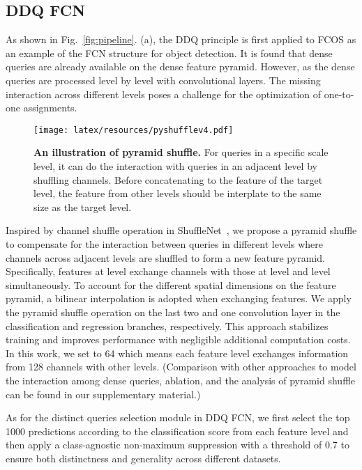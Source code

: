 \documentclass[10pt,twocolumn,letterpaper]{article}
\begin{document}
\subsection{DDQ FCN}   As shown in Fig.~\ref{fig:pipeline}. (a), the DDQ principle is first applied to FCOS as an example of the FCN structure for object detection. It is found that dense queries are already available on the dense feature pyramid. However, as the dense queries are processed level by level with convolutional layers. The missing interaction across different levels poses a challenge for the optimization of one-to-one assignments.

\begin{figure}[!h]
\centering
\texttt{[image: latex/resources/pyshufflev4.pdf]}
\vspace{-3mm}
\caption{\textbf{An illustration of pyramid shuffle.} For queries in a specific scale level,  it can do the interaction with queries in an adjacent level by shuffling  channels. Before concatenating to the feature of the target level, the feature from other levels should be interplate to the same size as the target level.}
\label{fig:shuffle}
\vspace{-3mm}
\end{figure}

Inspired by channel shuffle operation in ShuffleNet~\cite{zhang2018shufflenet}, we propose a pyramid shuffle to compensate for the interaction between queries in different levels where  channels across adjacent levels are shuffled to form a new feature pyramid. Specifically, features at level  exchange  channels with those at level  and level  simultaneously. To account for the different spatial dimensions on the feature pyramid, a bilinear interpolation is adopted when exchanging features. We apply the pyramid shuffle operation on the last two and one convolution layer in the classification and regression branches, respectively. This approach stabilizes training and improves performance with negligible additional computation costs. In this work, we set  to 64 which means each feature level exchanges information from 128 channels with other levels. (Comparison with other approaches to model the interaction among dense queries, ablation, and the analysis of pyramid shuffle can be found in our supplementary material.) 

As for the distinct queries selection module in DDQ FCN, we first select the top 1000 predictions according to the classification score from each feature level and then apply a class-agnostic non-maximum suppression with a threshold of 0.7 to ensure both distinctness and generality across different datasets.
\end{document}

